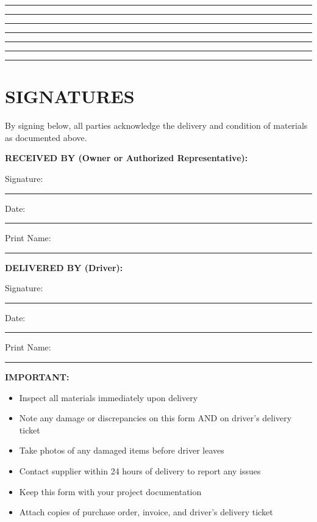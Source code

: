 \documentclass[11pt,letterpaper]{article}
\begin{document}
\rule{14cm}{0.4pt}

\rule{14cm}{0.4pt}

\rule{14cm}{0.4pt}

\rule{14cm}{0.4pt}

\rule{14cm}{0.4pt}

\rule{14cm}{0.4pt}

\rule{14cm}{0.4pt}

\vspace{12pt}

\section*{SIGNATURES}

By signing below, all parties acknowledge the delivery and condition of materials as documented above.

\vspace{12pt}

\textbf{RECEIVED BY (Owner or Authorized Representative):}

Signature: \rule{6cm}{0.4pt} Date: \rule{3cm}{0.4pt}

Print Name: \rule{6cm}{0.4pt}

\vspace{12pt}

\textbf{DELIVERED BY (Driver):}

Signature: \rule{6cm}{0.4pt} Date: \rule{3cm}{0.4pt}

Print Name: \rule{6cm}{0.4pt}

\vspace{6pt}

\textbf{IMPORTANT:}
\begin{itemize}[leftmargin=0.5in]
\item Inspect all materials immediately upon delivery
\item Note any damage or discrepancies on this form AND on driver's delivery ticket
\item Take photos of any damaged items before driver leaves
\item Contact supplier within 24 hours of delivery to report any issues
\item Keep this form with your project documentation
\item Attach copies of purchase order, invoice, and driver's delivery ticket
\end{itemize}
\end{document}
